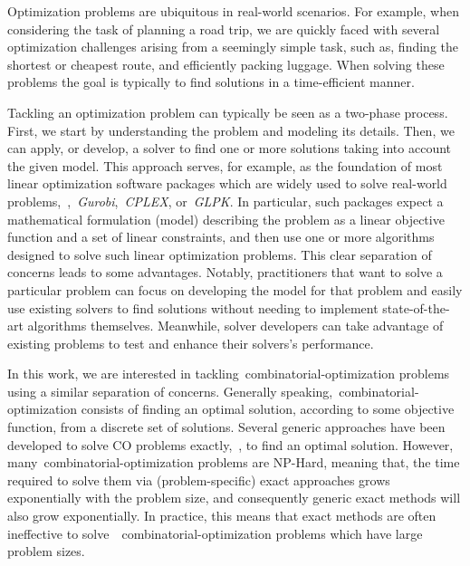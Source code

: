 Optimization problems are ubiquitous in real-world scenarios. For example, when
considering the task of planning a road trip, we are quickly faced with several
optimization challenges arising from a seemingly simple task, such as, finding
the shortest or cheapest route, and efficiently packing luggage. When solving
these problems the goal is typically to find  solutions in a
time-efficient manner.

Tackling an optimization problem can typically be seen as a two-phase process.
First, we start by understanding the problem and modeling its details. Then, we
can apply, or develop, a solver to find one or more solutions taking into
account the given model. This approach serves, for example, as the foundation of
most linear optimization software packages which are widely used to solve
real-world problems,~\eg{},~\textit{Gurobi},~\textit{CPLEX}, or~\textit{GLPK}.
In particular, such packages expect a mathematical formulation (model)
describing the problem as a linear objective function and a set of linear
constraints, and then use one or more algorithms designed to solve such linear
optimization problems. This clear separation of concerns leads to some
advantages. Notably, practitioners that want to solve a particular problem can
focus on developing the model for that problem and easily use existing solvers
to find solutions without needing to implement state-of-the-art algorithms
themselves. Meanwhile, solver developers can take advantage of existing problems
to test and enhance their solvers's performance.

In this work, we are interested in tackling~\acrfull{combinatorial-optimization}
problems using a similar separation of concerns. Generally
speaking,~\acrshort{combinatorial-optimization} consists of finding an optimal
solution, according to some objective function, from a discrete set of
solutions. Several generic approaches have been developed to solve CO problems
exactly,~\ie{}, to find an optimal solution. However,
many~\acrshort{combinatorial-optimization} problems are NP-Hard, meaning that,
the time required to solve them via (problem-specific) exact approaches grows
exponentially with the problem size, and consequently generic exact methods will
also grow exponentially. In practice, this means that exact methods are often
ineffective to
solve~~\acrshort{combinatorial-optimization} problems
which have large problem sizes.

